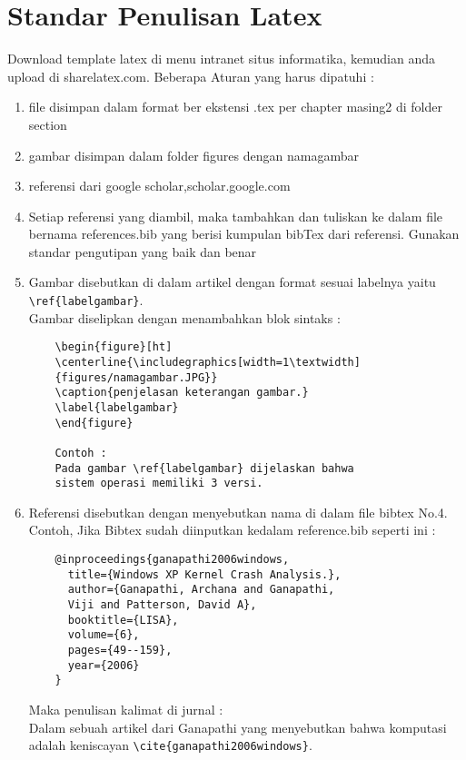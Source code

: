 \chapter{Standar Penulisan Latex}

Download template latex di menu intranet situs informatika, kemudian anda upload di sharelatex.com. Beberapa Aturan yang harus dipatuhi :
\begin{enumerate}

    \item file disimpan dalam format ber ekstensi .tex per chapter masing2 di folder section

    \item gambar disimpan dalam folder figures dengan namagambar

    \item referensi dari google scholar,scholar.google.com

    \item Setiap referensi yang diambil, maka tambahkan dan tuliskan ke dalam file bernama references.bib yang berisi kumpulan bibTex dari referensi. Gunakan standar pengutipan yang baik dan benar

    \item Gambar disebutkan di dalam artikel dengan format sesuai labelnya yaitu \\ \verb|\ref{labelgambar}|. \\ Gambar diselipkan dengan menambahkan blok sintaks :
    \begin{verbatim}
    \begin{figure}[ht]
    \centerline{\includegraphics[width=1\textwidth]
    {figures/namagambar.JPG}}
    \caption{penjelasan keterangan gambar.}
    \label{labelgambar}
    \end{figure}
    
    Contoh :
    Pada gambar \ref{labelgambar} dijelaskan bahwa 
    sistem operasi memiliki 3 versi.
    \end{verbatim}

    \item Referensi disebutkan dengan menyebutkan nama di dalam file bibtex No.4. \\
    Contoh, Jika Bibtex sudah diinputkan kedalam reference.bib seperti ini :
    \begin{verbatim}
    @inproceedings{ganapathi2006windows,
      title={Windows XP Kernel Crash Analysis.},
      author={Ganapathi, Archana and Ganapathi, 
      Viji and Patterson, David A},
      booktitle={LISA},
      volume={6},
      pages={49--159},
      year={2006}
    }
    \end{verbatim}
    Maka penulisan kalimat di jurnal : \\
    Dalam sebuah artikel dari Ganapathi yang 
    menyebutkan bahwa komputasi adalah keniscayan \verb|\cite{ganapathi2006windows}|.
    

\end{enumerate}
